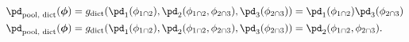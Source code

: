 \begin{align}
  \pd_{\text{pool, dict}} (\boldsymbol{\phi}) =
    g_{\text{dict}}(\pd_{1}(\phi_{1 \cap 2}), \pd_{2}(\phi_{1 \cap 2}, \phi_{2 \cap 3}), \pd_{3}(\phi_{2 \cap 3})) &=
    \pd_{1}(\phi_{1 \cap 2}) \pd_{3}(\phi_{2 \cap 3}) \label{eqn:dictatorial-pooling-one} \\
  \pd_{\text{pool, dict}} (\boldsymbol{\phi}) =
    g_{\text{dict}}(\pd_{1}(\phi_{1 \cap 2}), \pd_{2}(\phi_{1 \cap 2}, \phi_{2 \cap 3}), \pd_{3}(\phi_{2 \cap 3})) &=
    \pd_{2}(\phi_{1 \cap 2}, \phi_{2 \cap 3}). \label{eqn:dictatorial-pooling-two}
\end{align}